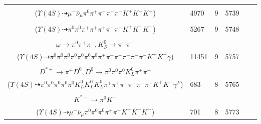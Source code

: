 \documentclass[landscape]{article}
\newcounter{rownumbers}
\newcommand\rn{\stepcounter{rownumbers}\arabic{rownumbers}}
\newcommand{\EOL}{\\} %
\newcommand{\topoTags}[1]{#1} %
\begin{document}
\begin{longtable}{clcccc}
\rn & \makecell[l]{ $ 
\Upsilon(4S) \rightarrow B^{0} \bar{B}^{0} ,
B^{0} \rightarrow \pi^{0} K^{+} K^{-} ,
\bar{B}^{0} \rightarrow \mu^{-} \bar{\nu}_{\mu} D^{*+} ,
D^{*+} \rightarrow \pi^{+} D^{0} ,
D^{0} \rightarrow K^{-} a_{1}^{+} ,
a_{1}^{+} \rightarrow \pi^{+} \pi^{+} \pi^{-} 
$ \\ ($
\Upsilon(4S) \dashrightarrow \mu^{-} \bar{\nu}_{\mu} \pi^{0} \pi^{+} \pi^{+} \pi^{+} \pi^{-} K^{+} K^{-} K^{-} 
$) } & \topoTags{4970 & }9 & 5739 \EOL

\rn & \makecell[l]{ $ 
\Upsilon(4S) \rightarrow B^{0} \bar{B}^{0} ,
B^{0} \rightarrow \pi^{0} K^{+} K^{-} ,
\bar{B}^{0} \rightarrow \rho^{0} \pi^{-} D^{*+} ,
\rho^{0} \rightarrow \pi^{+} \pi^{-} ,
D^{*+} \rightarrow \pi^{+} D^{0} ,
D^{0} \rightarrow \pi^{0} \pi^{+} K^{-} 
$ \\ ($
\Upsilon(4S) \dashrightarrow \pi^{0} \pi^{0} \pi^{+} \pi^{+} \pi^{+} \pi^{-} \pi^{-} K^{+} K^{-} K^{-} 
$) } & \topoTags{5267 & }9 & 5748 \EOL

\rn & \makecell[l]{ $ 
\Upsilon(4S) \rightarrow B^{0} \bar{B}^{0} ,
B^{0} \rightarrow \pi^{0} K^{+} K^{-} ,
\bar{B}^{0} \rightarrow \pi^{0} \omega \eta^{\prime} D^{0} ,
\omega \rightarrow \pi^{0} \pi^{+} \pi^{-} ,
\eta^{\prime} \rightarrow \omega \gamma ,
D^{0} \rightarrow \pi^{0} \pi^{0} \pi^{0} K_{S}^{0} ,
$ \\ $
\omega \rightarrow \pi^{0} \pi^{+} \pi^{-} ,
K_{S}^{0} \rightarrow \pi^{+} \pi^{-} 
$ \\ ($
\Upsilon(4S) \dashrightarrow \pi^{0} \pi^{0} \pi^{0} \pi^{0} \pi^{0} \pi^{0} \pi^{0} \pi^{+} \pi^{+} \pi^{+} \pi^{-} \pi^{-} \pi^{-} K^{+} K^{-} \gamma 
$) } & \topoTags{11451 & }9 & 5757 \EOL

\rn & \makecell[l]{ $ 
\Upsilon(4S) \rightarrow B^{0} \bar{B}^{0} ,
B^{0} \rightarrow \pi^{0} K^{+} K^{-} \gamma^{F} ,
\bar{B}^{0} \rightarrow \pi^{+} \pi^{-} \rho^{-} K^{0} \bar{K}^{0} D^{*+} ,
\rho^{-} \rightarrow \pi^{0} \pi^{-} ,
K^{0} \rightarrow K_{L}^{0} ,
\bar{K}^{0} \rightarrow K_{L}^{0} ,
$ \\ $
D^{*+} \rightarrow \pi^{+} D^{0} ,
D^{0} \rightarrow \pi^{0} \pi^{0} \pi^{0} K_{L}^{0} \pi^{+} \pi^{-} 
$ \\ ($
\Upsilon(4S) \dashrightarrow \pi^{0} \pi^{0} \pi^{0} \pi^{0} \pi^{0} K_{L}^{0} K_{L}^{0} K_{L}^{0} \pi^{+} \pi^{+} \pi^{+} \pi^{-} \pi^{-} \pi^{-} K^{+} K^{-} \gamma^{F} 
$) } & \topoTags{683 & }8 & 5765 \EOL

\rn & \makecell[l]{ $ 
\Upsilon(4S) \rightarrow B^{0} \bar{B}^{0} ,
B^{0} \rightarrow \pi^{0} K^{+} K^{-} ,
\bar{B}^{0} \rightarrow \mu^{-} \bar{\nu}_{\mu} D^{*+} ,
D^{*+} \rightarrow \pi^{+} D^{0} ,
D^{0} \rightarrow \rho^{+} K^{*-} ,
\rho^{+} \rightarrow \pi^{0} \pi^{+} ,
$ \\ $
K^{*-} \rightarrow \pi^{0} K^{-} 
$ \\ ($
\Upsilon(4S) \dashrightarrow \mu^{-} \bar{\nu}_{\mu} \pi^{0} \pi^{0} \pi^{0} \pi^{+} \pi^{+} K^{+} K^{-} K^{-} 
$) } & \topoTags{701 & }8 & 5773 \EOL


\end{longtable}
\end{document}
